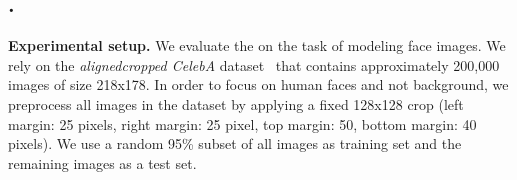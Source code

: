 \begin{table}[t]
        \center
    \caption{The negative log-likelihood of the different models for the CIFAR-10 \textbf{test set}
             measured as bits-per-dimension.}
	\label{table:nll}
\end{table}

\subsection{\PYRAMID.} 

\textbf{Experimental setup.} We evaluate the \PYRAMID on 
the task of modeling face images. We rely on the \emph{alignedcropped CelebA} 
dataset~\cite{liu2015faceattributes} that contains approximately 
200,000 images of size 218x178.
In order to focus on human faces and not background, we preprocess all images in the dataset by applying a 
fixed 128x128 crop (left margin: 25 pixels, right margin: 
25 pixel, top margin: 50, bottom margin: 40 pixels).
We use a random 95\% subset of all images as training set 
and the remaining images as a test set.


